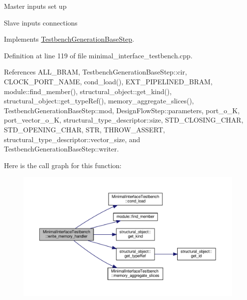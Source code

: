 Master inputs set up

Slave inputs connections 

Implements \hyperlink{classTestbenchGenerationBaseStep_a5c3f6e20a10e10fd2abded2de983d6ad}{Testbench\+Generation\+Base\+Step}.



Definition at line 119 of file minimal\+\_\+interface\+\_\+testbench.\+cpp.



References A\+L\+L\+\_\+\+B\+R\+AM, Testbench\+Generation\+Base\+Step\+::cir, C\+L\+O\+C\+K\+\_\+\+P\+O\+R\+T\+\_\+\+N\+A\+ME, cond\+\_\+load(), E\+X\+T\+\_\+\+P\+I\+P\+E\+L\+I\+N\+E\+D\+\_\+\+B\+R\+AM, module\+::find\+\_\+member(), structural\+\_\+object\+::get\+\_\+kind(), structural\+\_\+object\+::get\+\_\+type\+Ref(), memory\+\_\+aggregate\+\_\+slices(), Testbench\+Generation\+Base\+Step\+::mod, Design\+Flow\+Step\+::parameters, port\+\_\+o\+\_\+K, port\+\_\+vector\+\_\+o\+\_\+K, structural\+\_\+type\+\_\+descriptor\+::size, S\+T\+D\+\_\+\+C\+L\+O\+S\+I\+N\+G\+\_\+\+C\+H\+AR, S\+T\+D\+\_\+\+O\+P\+E\+N\+I\+N\+G\+\_\+\+C\+H\+AR, S\+TR, T\+H\+R\+O\+W\+\_\+\+A\+S\+S\+E\+RT, structural\+\_\+type\+\_\+descriptor\+::vector\+\_\+size, and Testbench\+Generation\+Base\+Step\+::writer.

Here is the call graph for this function\+:
\nopagebreak
\begin{figure}[H]
\begin{center}
\leavevmode
\includegraphics[width=350pt]{d0/dba/classMinimalInterfaceTestbench_a7dd0527a7925eb55406a3db09adecf99_cgraph}
\end{center}
\end{figure}
\mbox{\label{classMinimalInterfaceTestbench_a491e3de9b0dd7e94c304f15211d939e7}} 
